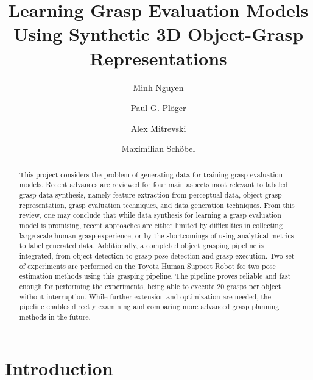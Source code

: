 \documentclass[runningheads]{../llncs}
\begin{document}
\title{Learning Grasp Evaluation Models Using Synthetic 3D Object-Grasp Representations}

%
\author{
    Minh Nguyen  \and
    Paul G. Pl\"{o}ger \and
    Alex Mitrevski \and
    Maximilian Sch\"{o}bel}
%
%
%
\maketitle              %

\begin{abstract}
This project considers the problem of generating data for training grasp evaluation models. Recent advances are reviewed
for four main aspects most relevant to labeled grasp data synthesis, namely feature extraction from perceptual data,
object-grasp representation, grasp evaluation techniques, and data generation techniques. From this review, one may
conclude that while data synthesis for learning a grasp evaluation model is promising, recent approaches are either
limited by difficulties in collecting large-scale human grasp experience, or by the shortcomings of using analytical
metrics to label generated data. Additionally, a completed object grasping pipeline is integrated, from object
detection to grasp pose detection and grasp execution. Two set of experiments are performed on the Toyota Human Support
Robot for two pose estimation methods using this grasping pipeline. The pipeline proves reliable and fast enough for
performing the experiments, being able to execute 20 grasps per object without interruption. While further extension and
optimization are needed, the pipeline enables directly examining and comparing more advanced grasp planning methods in
the future.

\end{abstract}

\section{Introduction}
\end{document}
